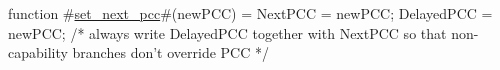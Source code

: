 function #\hyperref[sailMIPSzsetzynextzypcc]{set\_next\_pcc}#(newPCC) = {
  NextPCC    = newPCC;
  DelayedPCC = newPCC; /* always write DelayedPCC together with NextPCC so
                          that non-capability branches don't override PCC */
}
